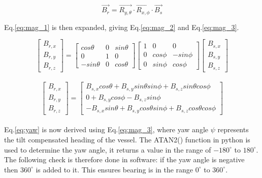 \begin{equation}
    \label{eq:mag_1}
    \vec{B_{r}} = \vec{R_{y,\theta}} \cdot \vec{R_{x,\phi}} \cdot \vec{B_{s}}
\end{equation}

Eq.\ref{eq:mag_1} is then expanded, giving Eq.\ref{eq:mag_2} and Eq.\ref{eq:mag_3}.

\begin{equation}
    \label{eq:mag_2}
    \begin{bmatrix} B_{r,x} \\ B_{r,y} \\ B_{r,z} \end{bmatrix} = \begin{bmatrix} cos\theta & 0 & sin\theta \\ 0 & 1 & 0 \\ -sin\theta & 0 & cos\theta \end{bmatrix} \begin{bmatrix} 1 & 0 & 0 \\ 0 & cos\phi & -sin\phi \\ 0 & sin\phi & cos\phi \end{bmatrix} \begin{bmatrix} B_{s,x} \\ B_{s,y} \\ B_{s,z} \end{bmatrix}
\end{equation}
\\
\begin{equation}
    \label{eq:mag_3}
    \begin{bmatrix} B_{r,x} \\ B_{r,y} \\ B_{r,z} \end{bmatrix} = \begin{bmatrix} B_{s,x} cos\theta + B_{s,y} sin\theta sin\phi + B_{s,z} sin\theta cos\phi \\ 0 + B_{s,y} cos\phi - B_{s,z} sin\phi \\ -B_{s,x} sin\theta +  B_{s,y} cos\theta sin\phi + B_{s,z} cos\theta cos\phi \end{bmatrix} 
\end{equation}
\\

Eq.\ref{eq:yaw} is now derived using Eq.\ref{eq:mag_3}, where yaw angle $\psi$ represents the tilt compensated heading of the vessel. The ATAN2() function in python is used to determine 
the yaw angle, it returns a value in the range of $-180^{\circ}$ to $180^{\circ}$. The following check is therefore done in software: if the yaw angle is negative then $360^{\circ}$ is added
to it. This ensures bearing is in the range $0^{\circ}$ to $360^{\circ}$.


